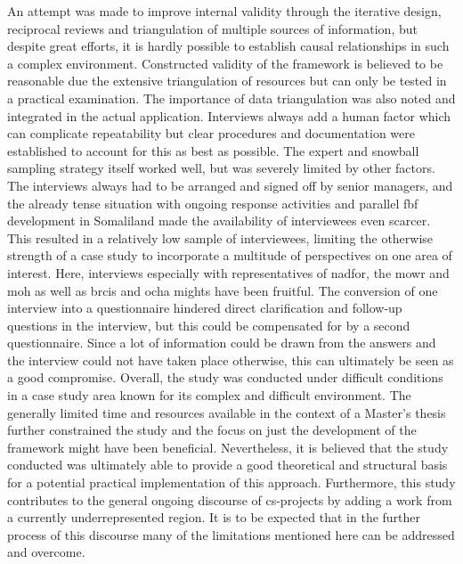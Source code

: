 An attempt was made to improve internal validity through the iterative design, reciprocal reviews and triangulation of multiple sources of information, but despite great efforts, it is hardly possible to establish causal relationships in such a complex environment. Constructed validity of the framework is believed to be reasonable due the extensive triangulation of resources but can only be tested in a practical examination. The importance of data triangulation was also noted and integrated in the actual application. Interviews always add a human factor which can complicate repeatability but clear procedures and documentation were established to account for this as best as possible. The expert and snowball sampling strategy itself worked well, but was severely limited by other factors. The interviews always had to be arranged and signed off by senior managers, and the already tense situation with ongoing response activities and parallel \acrshort{fbf} development in Somaliland made the availability of interviewees even scarcer. This resulted in a relatively low sample of interviewees, limiting the otherwise strength of a case study to incorporate a multitude of perspectives on one area of interest. Here, interviews especially with representatives of \acrshort{nadfor}, the \acrshort{mowr} and \acrshort{moh} as well as \acrshort{brcis} and \acrshort{ocha} mights have been fruitful. The conversion of one interview into a questionnaire hindered direct clarification and follow-up questions in the interview, but this could be compensated for by a second questionnaire. Since a lot of information could be drawn from the answers and the interview could not have taken place otherwise, this can ultimately be seen as a good compromise.\newline
Overall, the study was conducted under difficult conditions in a case study area known for its complex and difficult environment. The generally limited time and resources available in the context of a Master's thesis further constrained the study and the focus on just the development of the framework might have been beneficial. Nevertheless, it is believed that the study conducted was ultimately able to provide a good theoretical and structural basis for a potential practical implementation of this approach. Furthermore, this study contributes to the general ongoing discourse of \acrlong{cs}-projects by adding a work from a currently underrepresented region. It is to be expected that in the further process of this discourse many of the limitations mentioned here can be addressed and overcome.

